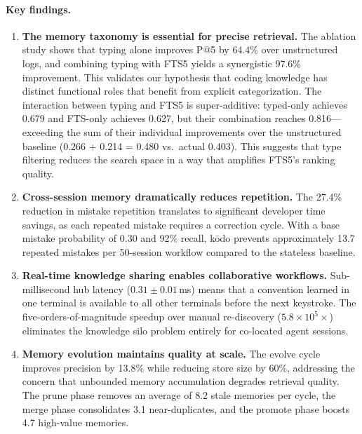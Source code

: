 \documentclass{article}
\begin{document}
\paragraph{Key findings.}
\begin{enumerate}
    \item \textbf{The memory taxonomy is essential for precise retrieval.} The ablation study shows that typing alone improves P@5 by 64.4\% over unstructured logs, and combining typing with FTS5 yields a synergistic 97.6\% improvement. This validates our hypothesis that coding knowledge has distinct functional roles that benefit from explicit categorization. The interaction between typing and FTS5 is super-additive: typed-only achieves 0.679 and FTS-only achieves 0.627, but their combination reaches 0.816---exceeding the sum of their individual improvements over the unstructured baseline (0.266 + 0.214 = 0.480 vs.\ actual 0.403). This suggests that type filtering reduces the search space in a way that amplifies FTS5's ranking quality.
    \item \textbf{Cross-session memory dramatically reduces repetition.} The 27.4\% reduction in mistake repetition translates to significant developer time savings, as each repeated mistake requires a correction cycle. With a base mistake probability of 0.30 and 92\% recall, k\=odo prevents approximately 13.7 repeated mistakes per 50-session workflow compared to the stateless baseline.
    \item \textbf{Real-time knowledge sharing enables collaborative workflows.} Sub-millisecond hub latency ($0.31 \pm 0.01$\,ms) means that a convention learned in one terminal is available to all other terminals before the next keystroke. The five-orders-of-magnitude speedup over manual re-discovery ($5.8 \times 10^5\times$) eliminates the knowledge silo problem entirely for co-located agent sessions.
    \item \textbf{Memory evolution maintains quality at scale.} The evolve cycle improves precision by 13.8\% while reducing store size by 60\%, addressing the concern that unbounded memory accumulation degrades retrieval quality. The prune phase removes an average of 8.2 stale memories per cycle, the merge phase consolidates 3.1 near-duplicates, and the promote phase boosts 4.7 high-value memories.
\end{enumerate}
\end{document}
